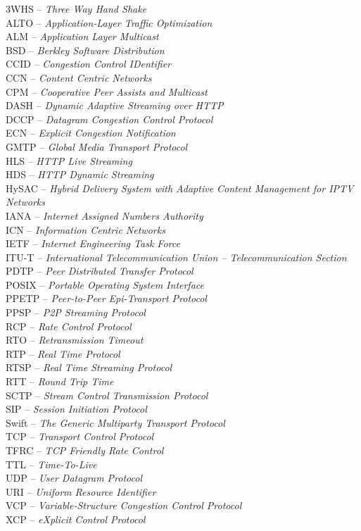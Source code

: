 3WHS		-- \textit{Three Way Hand Shake}\\
ALTO		-- \textit{Application-Layer Traffic Optimization}\\
ALM		-- \textit{Application Layer Multicast}\\
BSD		-- \textit{Berkley Software Distribution}\\
CCID		-- \textit{Congestion Control IDentifier}\\
CCN		-- \textit{Content Centric Networks}\\
CPM		-- \textit{Cooperative Peer Assists and Multicast}\\
DASH		-- \textit{Dynamic Adaptive Streaming over HTTP}\\
DCCP		-- \textit{Datagram Congestion Control Protocol}\\
ECN		-- \textit{Explicit Congestion Notification}\\
GMTP		-- \textit{Global Media Transport Protocol}\\
HLS		-- \textit{HTTP Live Streaming}\\
HDS		-- \textit{HTTP Dynamic Streaming}\\
HySAC		-- \textit{Hybrid Delivery System with Adaptive Content Management
for IPTV Networks}\\
IANA		-- \textit{Internet Assigned Numbers Authority}\\
ICN		-- \textit{Information Centric Networks}\\
IETF		-- \textit{Internet Engineering Task Force}\\
ITU-T		-- \textit{International Telecommunication Union --
Telecommunication Section}\\
PDTP		-- \textit{Peer Distributed Transfer Protocol}\\
POSIX		-- \textit{Portable Operating System Interface}\\
PPETP		-- \textit{Peer-to-Peer Epi-Transport Protocol}\\
PPSP		-- \textit{P2P Streaming Protocol}\\
RCP		-- \textit{Rate Control Protocol}\\
RTO		-- \textit{Retransmission Timeout}\\
RTP		-- \textit{Real Time Protocol}\\
RTSP		-- \textit{Real Time Streaming Protocol}\\
RTT		-- \textit{Round Trip Time}\\
SCTP		-- \textit{Stream Control Transmission Protocol}\\
SIP		-- \textit{Session Initiation Protocol}\\
Swift		-- \textit{The Generic Multiparty Transport Protocol}\\
TCP		-- \textit{Transport Control Protocol}\\
TFRC		-- \textit{TCP Friendly Rate Control}\\
TTL		-- \textit{Time-To-Live}\\
UDP		-- \textit{User Datagram Protocol}\\
URI		-- \textit{Uniform Resource Identifier}\\
VCP		-- \textit{Variable-Structure Congestion Control Protocol}\\
XCP		-- \textit{eXplicit Control Protocol}\\